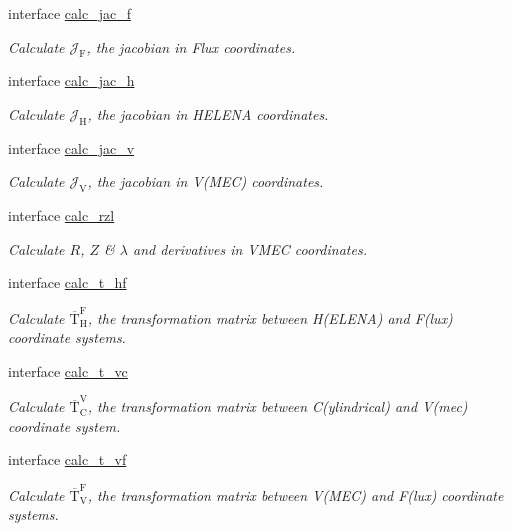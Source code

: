 \begin{DoxyCompactItemize}
interface \hyperlink{interfaceeq__ops_1_1calc__jac__f}{calc\+\_\+jac\+\_\+f}
\begin{DoxyCompactList}\small\item\em Calculate $\mathcal{J}_\text{F}$, the jacobian in Flux coordinates. \end{DoxyCompactList}\item 
interface \hyperlink{interfaceeq__ops_1_1calc__jac__h}{calc\+\_\+jac\+\_\+h}
\begin{DoxyCompactList}\small\item\em Calculate $\mathcal{J}_\text{H}$, the jacobian in H\+E\+L\+E\+NA coordinates. \end{DoxyCompactList}\item 
interface \hyperlink{interfaceeq__ops_1_1calc__jac__v}{calc\+\_\+jac\+\_\+v}
\begin{DoxyCompactList}\small\item\em Calculate $\mathcal{J}_\text{V}$, the jacobian in V(\+M\+E\+C) coordinates. \end{DoxyCompactList}\item 
interface \hyperlink{interfaceeq__ops_1_1calc__rzl}{calc\+\_\+rzl}
\begin{DoxyCompactList}\small\item\em Calculate $R$, $Z$ \& $\lambda$ and derivatives in V\+M\+EC coordinates. \end{DoxyCompactList}\item 
interface \hyperlink{interfaceeq__ops_1_1calc__t__hf}{calc\+\_\+t\+\_\+hf}
\begin{DoxyCompactList}\small\item\em Calculate $\overline{\text{T}}_\text{H}^\text{F}$, the transformation matrix between H(\+E\+L\+E\+N\+A) and F(lux) coordinate systems. \end{DoxyCompactList}\item 
interface \hyperlink{interfaceeq__ops_1_1calc__t__vc}{calc\+\_\+t\+\_\+vc}
\begin{DoxyCompactList}\small\item\em Calculate $\overline{\text{T}}_\text{C}^\text{V}$, the transformation matrix between C(ylindrical) and V(mec) coordinate system. \end{DoxyCompactList}\item 
interface \hyperlink{interfaceeq__ops_1_1calc__t__vf}{calc\+\_\+t\+\_\+vf}
\begin{DoxyCompactList}\small\item\em Calculate $\overline{\text{T}}_\text{V}^\text{F}$, the transformation matrix between V(\+M\+E\+C) and F(lux) coordinate systems. \end{DoxyCompactList}\item 

\end{DoxyCompactItemize}
